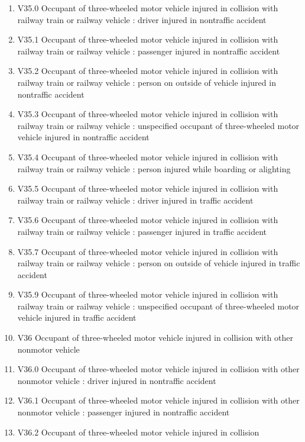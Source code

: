 \documentclass[
]{scrartcl}
\begin{document}
\begin{itemize}
\begin{enumerate}
  \item
    V35.0 Occupant of three-wheeled motor vehicle injured in collision
    with railway train or railway vehicle : driver injured in nontraffic
    accident
  \item
    V35.1 Occupant of three-wheeled motor vehicle injured in collision
    with railway train or railway vehicle : passenger injured in
    nontraffic accident
  \item
    V35.2 Occupant of three-wheeled motor vehicle injured in collision
    with railway train or railway vehicle : person on outside of vehicle
    injured in nontraffic accident
  \item
    V35.3 Occupant of three-wheeled motor vehicle injured in collision
    with railway train or railway vehicle : unspecified occupant of
    three-wheeled motor vehicle injured in nontraffic accident
  \item
    V35.4 Occupant of three-wheeled motor vehicle injured in collision
    with railway train or railway vehicle : person injured while
    boarding or alighting
  \item
    V35.5 Occupant of three-wheeled motor vehicle injured in collision
    with railway train or railway vehicle : driver injured in traffic
    accident
  \item
    V35.6 Occupant of three-wheeled motor vehicle injured in collision
    with railway train or railway vehicle : passenger injured in traffic
    accident
  \item
    V35.7 Occupant of three-wheeled motor vehicle injured in collision
    with railway train or railway vehicle : person on outside of vehicle
    injured in traffic accident
  \item
    V35.9 Occupant of three-wheeled motor vehicle injured in collision
    with railway train or railway vehicle : unspecified occupant of
    three-wheeled motor vehicle injured in traffic accident
  \item
    V36 Occupant of three-wheeled motor vehicle injured in collision
    with other nonmotor vehicle
  \item
    V36.0 Occupant of three-wheeled motor vehicle injured in collision
    with other nonmotor vehicle : driver injured in nontraffic accident
  \item
    V36.1 Occupant of three-wheeled motor vehicle injured in collision
    with other nonmotor vehicle : passenger injured in nontraffic
    accident
  \item
    V36.2 Occupant of three-wheeled motor vehicle injured in collision

\end{enumerate}
\end{itemize}
\end{document}
